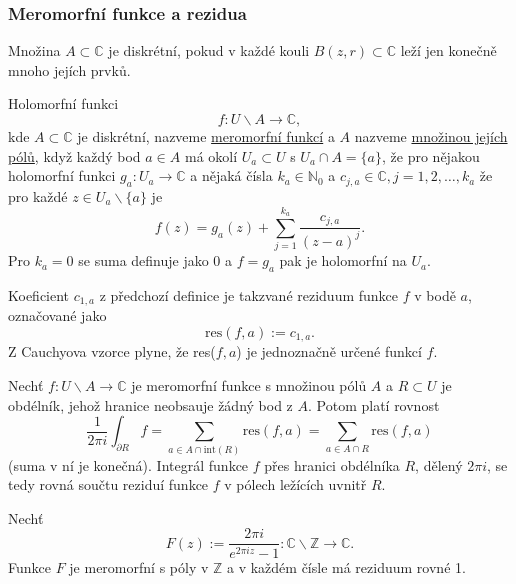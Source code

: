 \documentclass[../main.tex]{subfiles}
\begin{document}
\subsubsection{Meromorfní funkce a rezidua}

\begin{definition}
    Množina $A\subset \mathbb{C}$ je diskrétní, pokud v každé
    kouli $B(z,r)\subset \mathbb{C}$ leží jen konečně mnoho jejích prvků.
\end{definition}

\begin{definition}
    Holomorfní funkci \[ f: U\backslash A \to \mathbb{C}, \]
    kde $A\subset \mathbb{C}$ je diskrétní, nazveme \underline{meromorfní funkcí} a
    $A$ nazveme \underline{množinou jejích pólů}, když každý bod 
    $a \in A$ má okolí $U_a \subset U$ s $U_a \cap A = \{a\}$, že pro
    nějakou holomorfní funkci $g_a:U_a \to \mathbb{C}$ a nějaká
    čísla $k_a \in \mathbb{N}_0$ a $c_{j,a} \in\mathbb{C}, j = 1,2,\dots,k_a$ že pro každé
    $z \in U_a\backslash \{a\}$ je
    \[ f(z) = g_a(z) + \sum_{j=1}^{k_a} \frac{c_{j,a}}{(z-a)^j}. \]
    Pro $k_a = 0$ se suma definuje jako 0 a $f = g_a$ pak je holomorfní na $U_a$.
\end{definition}

\begin{definition}
    Koeficient $c_{1,a}$ z předchozí definice je takzvané reziduum funkce $f$ v bodě $a$,
    označované jako \[ \text{res}(f,a) := c_{1,a}. \]
    Z Cauchyova vzorce plyne, že res($f,a$) je jednoznačně určené funkcí $f$.
\end{definition}

\begin{theorem}[Reziduová]
    Nechť $f:U\backslash A\to\mathbb{C}$ je meromorfní funkce s množinou pólů $A$ a $R\subset U$ je obdélník,
    jehož hranice neobsauje žádný bod z $A$. Potom platí rovnost
    \[ \frac{1}{2\pi i}\int_{\partial R}f = \sum_{a\in A\cap\text{int}(R)} \text{res}(f,a) = \sum_{a\in A\cap R} \text{res}(f,a) \]
    (suma v ní je konečná). Integrál funkce $f$ přes hranici obdélníka $R$, dělený $2\pi i$, se tedy rovná součtu reziduí funkce $f$ v pólech ležících
    uvnitř $R$.
\end{theorem}

\begin{lemma}[O funkci $F(z)$]
    Nechť \[ F(z) := \frac{2\pi i}{e^{2\pi iz} - 1}: \mathbb{C} \backslash \mathbb{Z} \to \mathbb{C}. \]
    Funkce $F$ je meromorfní s póly v $\mathbb{Z}$ a v každém čísle má reziduum rovné 1.
\end{lemma}
\end{document}
